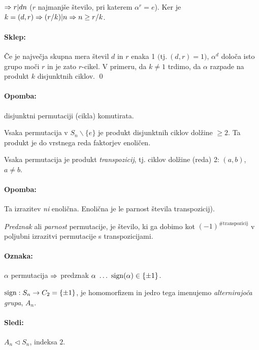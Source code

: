 \begin{enumerate}
{		\ni $\Rightarrow r|dn$ ($r$ najmanj\v se \v stevilo, pri katerem $\alpha^r = e$). Ker je $k = (d,r) \Rightarrow (r/k)|n \Rightarrow n \geq r/k$.
		\paragraph{Sklep:}\v Ce je najve\v cja skupna mera \v stevil $d$ in $r$ enaka 1 $\big(\text{tj.}\ (d,r) = 1\big)$, $\alpha^d$ dolo\v ca isto grupo mo\v ci
		$r$ in je zato $r$-cikel. V primeru, da $k \neq 1$ trdimo, da $\alpha$ razpade na produkt $k$ disjunktnih ciklov.
		\qed}
\end{enumerate}

\paragraph{Opomba:} disjunktni permutaciji (cikla) komutirata.

\begin{trditev}
	Vsaka permutacija v $S_n\backslash\{e\}$ je produkt disjunktnih ciklov dol\v zine $\geq 2$. Ta produkt je do vrstnega reda faktorjev enoli\v cen.
\end{trditev}

\begin{posledica}
	Vsaka permutacija je produkt \emph{transpozicij}, tj. ciklov dol\v zine (reda) 2: $(a,b)$, $a \neq b$.

	\paragraph{Opomba:} Ta izrazitev \emph{ni} enoli\v cna. Enoli\v cna je le parnost \v stevila transpozicij).
\end{posledica}

\begin{defin}
	\emph{Predznak} ali \emph{parnost} permutacije, je \v stevilo, ki ga dobimo kot $(-1)^{\# \text{transpozicij}}$ v poljubni izrazitvi permutacije s transpozicijami.
	
	\paragraph{Oznaka:} $\alpha$ permutacija $\Rightarrow$ predznak $\alpha\ \ldots\ \operatorname{sign}(\alpha) \in \{\pm 1\}$.
\end{defin}

\begin{trditev}
	$\operatorname{sign} : S_n \to C_2 = \{\pm 1\}$, je homomorfizem in jedro tega imenujemo \emph{alternirajo\v ca grupa}, $A_n$.
	\paragraph{Sledi:} $A_n \lhd S_n$, indeksa $2$.
\end{trditev}


